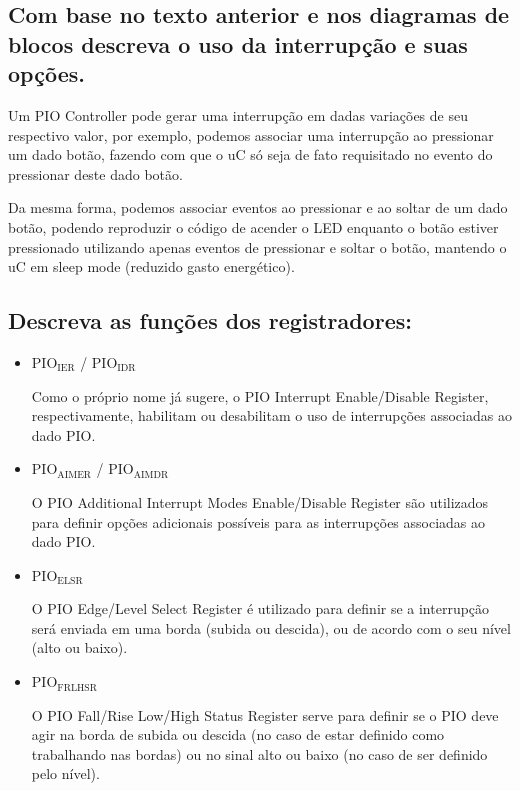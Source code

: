 \documentclass[11pt]{article}
\begin{document}
\subsection{Com base no texto anterior e nos diagramas de blocos descreva o uso da interrupção e suas opções.}
\label{sec:orgheadline14}
Um PIO Controller pode gerar uma interrupção em dadas variações de seu
respectivo valor, por exemplo, podemos associar uma interrupção ao pressionar
um dado botão, fazendo com que o uC só seja de fato requisitado no evento do
pressionar deste dado botão.

Da mesma forma, podemos associar eventos ao pressionar e ao soltar de um dado
botão, podendo reproduzir o código de acender o LED enquanto o botão estiver
pressionado utilizando apenas eventos de pressionar e soltar o botão, mantendo
o uC em sleep mode (reduzido gasto energético).
\subsection{Descreva as funções dos registradores:}
\label{sec:orgheadline15}
\begin{itemize}
\item PIO\(_{\text{IER}}\) / PIO\(_{\text{IDR}}\)

Como o próprio nome já sugere, o PIO Interrupt Enable/Disable Register,
respectivamente, habilitam ou desabilitam o uso de interrupções associadas ao
dado PIO.

\item PIO\(_{\text{AIMER}}\) / PIO\(_{\text{AIMDR}}\)

O PIO Additional Interrupt Modes Enable/Disable Register são utilizados para
definir opções adicionais possíveis para as interrupções associadas ao dado
PIO.

\item PIO\(_{\text{ELSR}}\)

O PIO Edge/Level Select Register é utilizado para definir se a interrupção
será enviada em uma borda (subida ou descida), ou de acordo com o seu nível
(alto ou baixo).

\item PIO\(_{\text{FRLHSR}}\)

O PIO Fall/Rise Low/High Status Register serve para definir se o PIO deve
agir na borda de subida ou descida (no caso de estar definido como
trabalhando nas bordas) ou no sinal alto ou baixo (no caso de ser definido
pelo nível).
\end{itemize}
\end{document}
